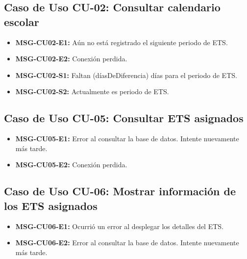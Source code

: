 \subsection{Caso de Uso CU-02: Consultar calendario escolar}
\begin{itemize}
	\item \textbf{\label{msg:CU02-E1}MSG-CU02-E1:} Aún no está registrado el siguiente periodo de ETS.
	\item \textbf{\label{msg:CU02-E2}MSG-CU02-E2:} Conexión perdida.
	\item \textbf{\label{msg:CU02-S1}MSG-CU02-S1:} Faltan (díasDeDiferencia) días para el periodo de ETS.
	\item \textbf{\label{msg:CU02-S2}MSG-CU02-S2:} Actualmente es periodo de ETS.
\end{itemize}

\subsection{Caso de Uso CU-05: Consultar ETS asignados}
\begin{itemize}
	\item \textbf{\label{msg:CU05-E1}MSG-CU05-E1:} Error al consultar la base de datos. Intente nuevamente más tarde.
	\item \textbf{\label{msg:CU05-E2}MSG-CU05-E2:} Conexión perdida.
\end{itemize}

\subsection{Caso de Uso CU-06: Mostrar información de los ETS asignados}
\begin{itemize}
	\item \textbf{\label{msg:CU06-E1}MSG-CU06-E1:} Ocurrió un error al desplegar los detalles del ETS.
	\item \textbf{\label{msg:CU06-E2}MSG-CU06-E2:} Error al consultar la base de datos. Intente nuevamente más tarde.
\end{itemize}


